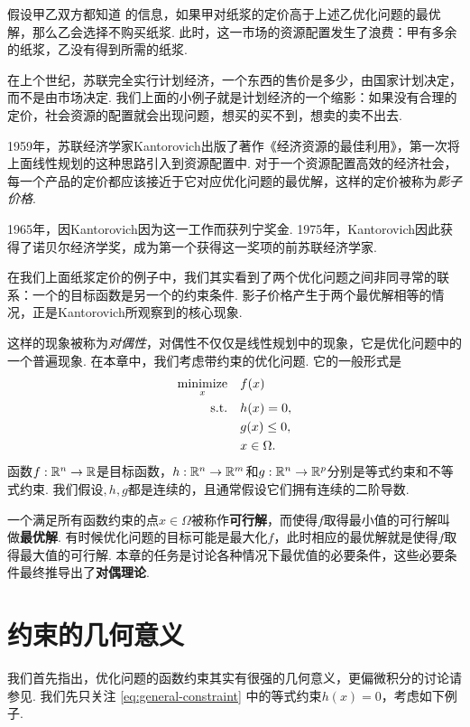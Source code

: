 假设甲乙双方都知道 的信息，如果甲对纸浆的定价高于上述乙优化问题的最优解，那么乙会选择不购买纸浆. 此时，这一市场的资源配置发生了浪费：甲有多余的纸浆，乙没有得到所需的纸浆.

在上个世纪，苏联完全实行计划经济，一个东西的售价是多少，由国家计划决定，而不是由市场决定. 我们上面的小例子就是计划经济的一个缩影：如果没有合理的定价，社会资源的配置就会出现问题，想买的买不到，想卖的卖不出去.

1959年，苏联经济学家Kantorovich出版了著作《经济资源的最佳利用》，第一次将上面线性规划的这种思路引入到资源配置中. 对于一个资源配置高效的经济社会，每一个产品的定价都应该接近于它对应优化问题的最优解，这样的定价被称为\textit{影子价格}. 

1965年，因Kantorovich因为这一工作而获列宁奖金. 1975年，Kantorovich因此获得了诺贝尔经济学奖，成为第一个获得这一奖项的前苏联经济学家. 

在我们上面纸浆定价的例子中，我们其实看到了两个优化问题之间非同寻常的联系：一个的目标函数是另一个的约束条件. 影子价格产生于两个最优解相等的情况，正是Kantorovich所观察到的核心现象. 

这样的现象被称为\textit{对偶性}，对偶性不仅仅是线性规划中的现象，它是优化问题中的一个普遍现象. 在本章中，我们考虑带约束的优化问题. 它的一般形式是
\begin{equation}
\begin{aligned}
    \operatorname*{minimize}_x\quad& f(x) \\
    \text{s.t.}\quad& h(x)=0,\\
    & g(x)\leq 0, \\
    & x \in \Omega.
\end{aligned}\label{eq:general-constraint}    
\end{equation}
函数$f:\mathbb{R}^n\to \mathbb{R}$是目标函数，$h:\mathbb{R}^n\to \mathbb{R}^m$和$g:\mathbb{R}^n\to \mathbb{R}^p$分别是等式约束和不等式约束. 我们假设$
,h,g$都是连续的，且通常假设它们拥有连续的二阶导数.

一个满足所有函数约束的点$x\in\Omega$被称作\textbf{可行解}，而使得$f$取得最小值的可行解叫做\textbf{最优解}. 有时候优化问题的目标可能是最大化$f$，此时相应的最优解就是使得$f$取得最大值的可行解. 本章的任务是讨论各种情况下最优值的必要条件，这些必要条件最终推导出了\textbf{对偶理论}. 

\section{约束的几何意义}\label{sec:constraint-geometry}

我们首先指出，优化问题的函数约束其实有很强的几何意义，更偏微积分的讨论请参见. 我们先只关注 \eqref{eq:general-constraint} 中的等式约束$h(x)=0$，考虑如下例子. 

